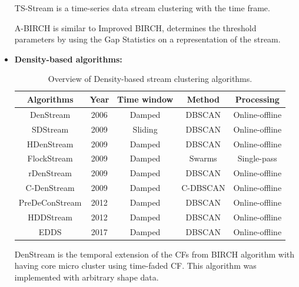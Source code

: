 \documentclass[../UNBThesis2.tex]{subfiles}
\begin{document}
\begin{itemize}
TS-Stream \cite{pereira2014ts} is a time-series data stream clustering with the time frame. 

A-BIRCH \cite{lorbeer2016birch} is similar to Improved BIRCH, determines the threshold parameters by using the Gap Statistics on a representation of the stream.



\item\textbf{Density-based algorithms:}

\begin{table}[h]
    \centering
    \caption{Overview of Density-based stream clustering algorithms. }
    \label{densalgo}
    \small
    \begin{tabular}{c c c c c}
    \hline
      \textbf{Algorithms} & \textbf{Year} & \textbf{ Time window } & \textbf{Method} & \textbf{ Processing}  \\
     \hline \midrule

      DenStream          &    2006        &    Damped          &    DBSCAN      & Online-offline \\
     \hline
     SDStream            &    2009        &    Sliding         &    DBSCAN      & Online-offline \\
      \hline
      HDenStream         &     2009       &     Damped         &    DBSCAN      &  Online-offline \\
    \hline 
      FlockStream        &    2009        &     Damped        &     Swarms      & Single-pass\\
    \hline 
      rDenStream         &    2009        &    Damped         &     DBSCAN      & Online-offline \\
          \hline 
      C-DenStream        &    2009        &    Damped         &     C-DBSCAN    &Online-offline \\
          \hline 
      PreDeConStream     &    2012        &   Damped          &     DBSCAN      & Online-offline\\
          \hline 
      HDDStream          &    2012        &   Damped          &     DBSCAN      & Online-offline\\
          \hline 
      EDDS               &    2017        &   Damped          &     DBSCAN      & Online-offline\\
\bottomrule
    \end{tabular}
\end{table}

DenStream \cite{cao2006density} is the temporal extension of the CFs from BIRCH algorithm with having core micro cluster using time-faded CF. This algorithm was implemented with arbitrary shape data.


\end{itemize}
\end{document}
